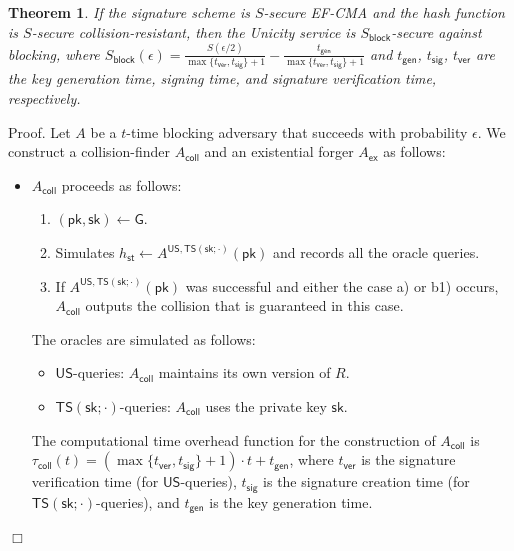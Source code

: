 \documentclass{article}
\newtheorem{theorem}{Theorem}[section]
\newenvironment{proof}{\textsf{Proof}.}{\hfill$\Box$}
\newcommand{\pubkey}[0]{\mathsf{pk}}
\newcommand{\prikey}[0]{\mathsf{sk}}
\newcommand{\unisrv}[0]{\mathsf{US}}
\begin{document}
\begin{theorem}
If the signature scheme is $S$-secure EF-CMA and the hash function is $S$-secure collision-resistant, then the Unicity service is
$S_\mathsf{block}$-secure against blocking, where $S_\mathsf{block}(\epsilon) =
\frac{S(\epsilon/2)}{\max\{t_\mathsf{ver}, t_\mathsf{sig}\}+1} - \frac{t_\mathsf{gen}}{\max\{t_\mathsf{ver}, t_\mathsf{sig}\}+1}$
and
$t_\mathsf{gen}$, $t_\mathsf{sig}$, $t_\mathsf{ver}$ are the
key generation time, signing time, and signature verification time, respectively.
\end{theorem}
\begin{proof}
Let $A$ be a $t$-time blocking adversary that succeeds with probability $\epsilon$. We construct a collision-finder $A_\mathsf{coll}$ and an
existential forger $A_\mathsf{ex}$ as follows:
\begin{itemize}
\item $A_\mathsf{coll}$ proceeds as follows:
 \begin{enumerate}
   \item $(\pubkey,\prikey)\gets \mathsf{G}$.
   \item Simulates $h_\mathsf{st}\gets A^{\mathsf{US},\mathsf{TS}(\prikey;\cdot)}(\pubkey)$ and records all the oracle queries.
   \item If $A^{\mathsf{US},\mathsf{TS}(\prikey;\cdot)}(\pubkey)$ was successful and either the case a) or b1) occurs, $A_\mathsf{coll}$ outputs the collision that is guaranteed in this case.
 \end{enumerate}
The oracles are simulated as follows:
 \begin{itemize}
   \item $\mathsf{US}$-queries: $A_\mathsf{coll}$ maintains its own version of $R$.
   \item $\mathsf{TS}(\prikey;\cdot)$-queries: $A_\mathsf{coll}$ uses the private key $\prikey$.
\end{itemize}
The computational time overhead function for the construction of $A_\mathsf{coll}$ is $\tau_\mathsf{coll}(t) = (\max\{t_\mathsf{ver}, t_\mathsf{sig}\}+1)\cdot t + t_\mathsf{gen}$, where
$t_\mathsf{ver}$ is the signature verification time (for $\unisrv$-queries),
$t_\mathsf{sig}$ is the signature creation time (for $\mathsf{TS}(\prikey;\cdot)$-queries), and $t_\mathsf{gen}$ is the key generation time.


\end{itemize}
\end{proof}
\end{document}
